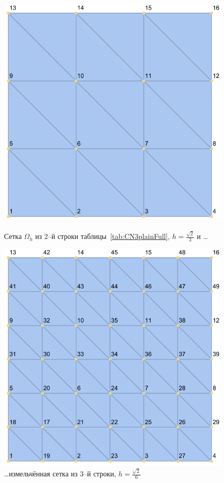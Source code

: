 \begin{figure}[!h]
	\includegraphics[width=\linewidth]{img/n16mesh.pdf}
	\caption{Сетка $\Omega_h$ из 2--й строки таблицы~\ref{tab:CN3plainFull}, $h = \frac{\sqrt{2}}{3}$ и \dots}\label{fig:n16mesh}
	\endminipage\hfill
	\includegraphics[width=\linewidth]{img/n49mesh.pdf}
	\caption{\dots измельчённая сетка из 3--й строки, $h = \frac{\sqrt{2}}{6}$}\label{fig:n49mesh}
	\endminipage
\end{figure}

